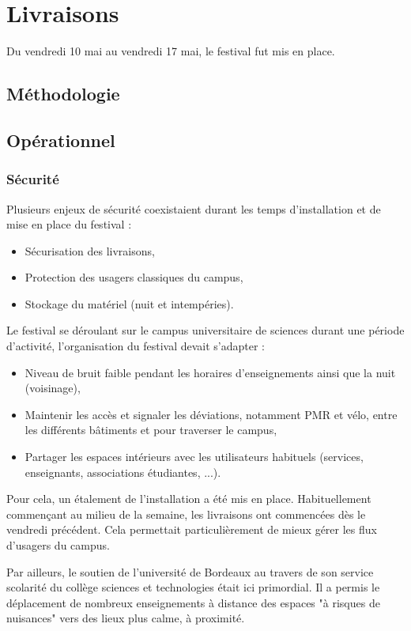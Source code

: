\documentclass[12pt,a4paper,draft]{report}
\begin{document}
\chapter{Livraisons}
Du vendredi 10 mai au vendredi 17 mai, le festival fut mis en place. 
\section{Méthodologie}


\section{Opérationnel}
\subsection{Sécurité}
Plusieurs enjeux de sécurité coexistaient durant les temps d'installation et de mise en place du festival : 
\begin{itemize}
\item Sécurisation des livraisons,
\item Protection des usagers classiques du campus,
\item Stockage du matériel (nuit et intempéries).
\end{itemize} 


Le festival se déroulant sur le campus universitaire de sciences durant une période d'activité, l'organisation du festival devait s'adapter : 
\begin{itemize}
\item Niveau de bruit faible pendant les horaires d'enseignements ainsi que la nuit (voisinage),
\item Maintenir les accès et signaler les déviations, notamment PMR et vélo, entre les différents bâtiments et pour traverser le campus,
\item Partager les espaces intérieurs avec les utilisateurs habituels (services, enseignants, associations étudiantes, ...).
\end{itemize}

Pour cela, un étalement de l'installation a été mis en place. Habituellement commençant au milieu de la semaine, les livraisons ont commencées dès le vendredi précédent. Cela permettait particulièrement de mieux gérer les flux d'usagers du campus.

Par ailleurs, le soutien de l'université de Bordeaux au travers de son service scolarité du collège sciences et technologies était ici primordial. Il a permis le déplacement de nombreux enseignements à distance des espaces "à risques de nuisances" vers des lieux plus calme, à proximité.
\end{document}
